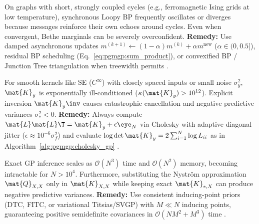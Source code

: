 \documentclass[../../../../master.tex]{subfiles}
\begin{document}
\begin{pitfall}
\label{pit:pgmgp:loopy_bp}
On graphs with short, strongly coupled cycles (e.g., ferromagnetic Ising grids at low temperature), synchronous Loopy BP frequently oscillates or diverges because messages reinforce their own echoes around cycles. Even when convergent, Bethe marginals can be severely overconfident. \textbf{Remedy:} Use damped asynchronous updates $m^{(k+1)} \gets (1-\alpha)m^{(k)} + \alpha m^{\mathrm{new}}$ ($\alpha \in (0, 0.5]$), residual BP scheduling (Eq.~\eqref{eq:pgmgp:sum_product}), or convexified BP / Junction Tree triangulation when treewidth permits .
\end{pitfall}

\begin{pitfall}
\label{pit:pgmgp:cholesky}
For smooth kernels like SE ($C^\infty$) with closely spaced inputs or small noise $\sigma_y^2$, $\mat{K}_y$ is exponentially ill-conditioned ($\kappa(\mat{K}_y) > 10^{12}$). Explicit inversion $\mat{K}_y\inv$ causes catastrophic cancellation and negative predictive variances $\sigma_*^2 < 0$. \textbf{Remedy:} Always compute $\mat{L}\mat{L}\T = \mat{K}_y + \epsilon \eye_N$ via Cholesky with adaptive diagonal jitter ($\epsilon \approx 10^{-6}\sigma_f^2$) and evaluate $\log\det\mat{K}_y = 2\sum_{i=1}^N \log L_{ii}$ as in Algorithm~\ref{alg:pgmgp:cholesky_gp} .
\end{pitfall}

\begin{pitfall}
\label{pit:pgmgp:nystrom}
Exact GP inference scales as $\mathcal{O}(N^3)$ time and $\mathcal{O}(N^2)$ memory, becoming intractable for $N > 10^4$. Furthermore, substituting the Nystr\"om approximation $\mat{Q}_{X,X}$ only in $\mat{K}_{X,X}$ while keeping exact $\mat{K}_{*,X}$ can produce negative predictive variances. \textbf{Remedy:} Use consistent inducing-point priors (DTC, FITC, or variational Titsias/SVGP) with $M \ll N$ inducing points, guaranteeing positive semidefinite covariances in $\mathcal{O}(NM^2 + M^3)$ time .
\end{pitfall}
\end{document}
